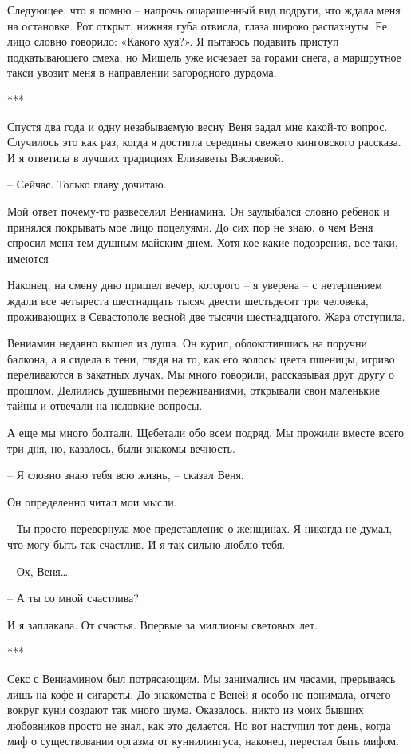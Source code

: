 \documentclass[
]{book}
\begin{document}
Следующее, что я помню -- напрочь ошарашенный вид подруги, что ждала меня на остановке. Рот открыт, нижняя губа отвисла, глаза широко распахнуты. Ее лицо словно говорило: «Какого хуя?». Я пытаюсь подавить приступ подкатывающего смеха, но Мишель уже исчезает за горами снега, а маршрутное такси увозит меня в направлении загородного дурдома.

***

Спустя два года и одну незабываемую весну Веня задал мне какой-то вопрос. Случилось это как раз, когда я достигла середины свежего кинговского рассказа. И я ответила в лучших традициях Елизаветы Васляевой.

-- Сейчас. Только главу дочитаю.

Мой ответ почему-то развеселил Вениамина. Он заулыбался словно ребенок и принялся покрывать мое лицо поцелуями. До сих пор не знаю, о чем Веня спросил меня тем душным майским днем. Хотя кое-какие подозрения, все-таки, имеются

Наконец, на смену дню пришел вечер, которого -- я уверена -- с нетерпением ждали все четыреста шестнадцать тысяч двести шестьдесят три человека, проживающих в Севастополе весной две тысячи шестнадцатого. Жара отступила.

Вениамин недавно вышел из душа. Он курил, облокотившись на поручни балкона, а я сидела в тени, глядя на то, как его волосы цвета пшеницы, игриво переливаются в закатных лучах. Мы много говорили, рассказывая друг другу о прошлом. Делились душевными переживаниями, открывали свои маленькие тайны и отвечали на неловкие вопросы.

А еще мы много болтали. Щебетали обо всем подряд. Мы прожили вместе всего три дня, но, казалось, были знакомы вечность.

-- Я словно знаю тебя всю жизнь, -- сказал Веня.

Он определенно читал мои мысли.

-- Ты просто перевернула мое представление о женщинах. Я никогда не думал, что могу быть так счастлив. И я так сильно люблю тебя.

-- Ох, Веня\ldots{}

-- А ты со мной счастлива?

И я заплакала. От счастья. Впервые за миллионы световых лет.

***

Секс с Вениамином был потрясающим. Мы занимались им часами, прерываясь лишь на кофе и сигареты. До знакомства с Веней я особо не понимала, отчего вокруг куни создают так много шума. Оказалось, никто из моих бывших любовников просто не знал, как это делается. Но вот наступил тот день, когда миф о существовании оргазма от куннилингуса, наконец, перестал быть мифом.
\end{document}
